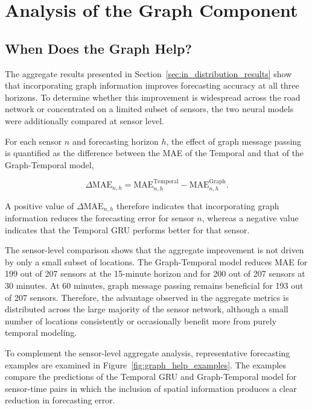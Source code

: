 \section{Analysis of the Graph Component}
\label{sec:graph_analysis}

\subsection{When Does the Graph Help?}
\label{subsec:graph_effect}

The aggregate results presented in Section~\ref{sec:in_distribution_results}
show that incorporating graph information improves forecasting accuracy at
all three horizons. To determine whether this improvement is widespread
across the road network or concentrated on a limited subset of sensors, the
two neural models were additionally compared at sensor level.

For each sensor $n$ and forecasting horizon $h$, the effect of graph message
passing is quantified as the difference between the MAE of the Temporal
and that of the Graph-Temporal model,

\begin{equation}
    \Delta \mathrm{MAE}_{n,h}
    =
    \mathrm{MAE}^{\mathrm{Temporal}}_{n,h}
    -
    \mathrm{MAE}^{\mathrm{Graph}}_{n,h}.
    \label{eq:delta_mae}
\end{equation}

A positive value of $\Delta \mathrm{MAE}_{n,h}$ therefore indicates that
incorporating graph information reduces the forecasting error for sensor
$n$, whereas a negative value indicates that the Temporal GRU performs
better for that sensor.

The sensor-level comparison shows that the aggregate improvement is not
driven by only a small subset of locations. The Graph-Temporal model reduces
MAE for 199 out of 207 sensors at the 15-minute horizon and for 200 out of
207 sensors at 30 minutes. At 60 minutes, graph message passing remains
beneficial for 193 out of 207 sensors. Therefore, the advantage observed in
the aggregate metrics is distributed across the large majority of the sensor
network, although a small number of locations consistently or occasionally
benefit more from purely temporal modeling.

To complement the sensor-level aggregate analysis, representative forecasting
examples are examined in Figure~\ref{fig:graph_help_examples}. The examples
compare the predictions of the Temporal GRU and Graph-Temporal model for
sensor-time pairs in which the inclusion of spatial information produces a
clear reduction in forecasting error.


